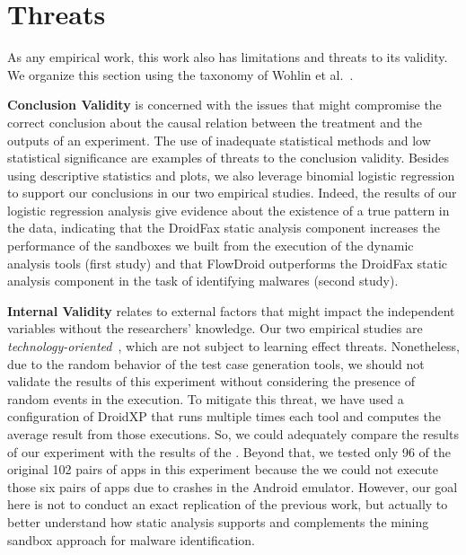 \section{Threats}

As any empirical work, this work also has
limitations and threats to its validity. We
organize this section using the taxonomy
of Wohlin et al.~\cite[Chapter 8]{10.5555/2349018}.

\textbf{Conclusion Validity} is concerned with
the issues that might compromise the
correct conclusion about the causal relation
between the treatment and the outputs of an
experiment. The use of inadequate statistical
methods and low statistical significance
are examples of threats to the conclusion validity.
Besides using descriptive statistics and
plots, we also leverage
binomial logistic regression to support our conclusions
in our two empirical studies. Indeed, the results of our logistic
regression analysis give evidence about the existence
of a true pattern in the data, indicating that the DroidFax
static analysis component increases the performance of the sandboxes
we built from the execution of the dynamic
analysis tools (first study) and that FlowDroid outperforms
the DroidFax static analysis component in the
task of identifying malwares (second study).

\textbf{Internal Validity} relates to external factors that might
impact the independent variables without the researchers' 
knowledge. Our two empirical studies are \emph{technology-oriented}~\cite{10.5555/2349018,expruna},
which are not subject to learning effect threats. Nonetheless,
due to the random behavior of the test case generation tools,
we should not validate the results of this experiment without considering the presence of
random events in the execution. To mitigate this threat, we have used a configuration of
DroidXP that runs multiple times each tool and computes the average result
from those executions. So, we could adequately compare the results of our experiment with
the results of the \blls. Beyond that,
we tested only 96 of the original 102 pairs of apps in this experiment because the we
could not execute those six pairs of apps due to crashes in the Android emulator.
However, our goal here is not to conduct an exact replication of the previous work,
but actually to better understand how static analysis supports and complements
the mining sandbox approach for malware identification. 

